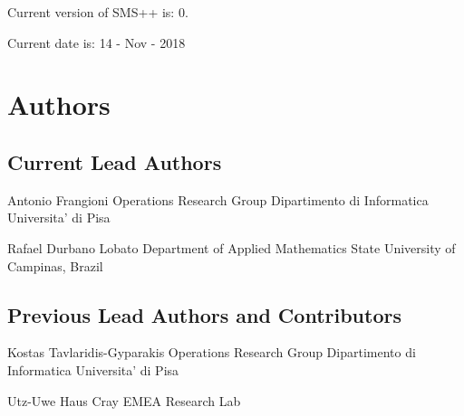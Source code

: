 \begin{DoxyItemize}
\item Current version of S\+M\+S++ is\+: 0.
\item Current date is\+: 14 -\/ Nov -\/ 2018
\end{DoxyItemize}

\section*{Authors }

\subsection*{Current Lead Authors }

\begin{DoxyVerb}Antonio Frangioni
Operations Research Group
Dipartimento di Informatica
Universita' di Pisa

Rafael Durbano Lobato
Department of Applied Mathematics
State University of Campinas, Brazil
\end{DoxyVerb}


\subsection*{Previous Lead Authors and Contributors }

\begin{DoxyVerb}Kostas Tavlaridis-Gyparakis
Operations Research Group
Dipartimento di Informatica
Universita' di Pisa

Utz-Uwe Haus
Cray EMEA Research Lab\end{DoxyVerb}
 